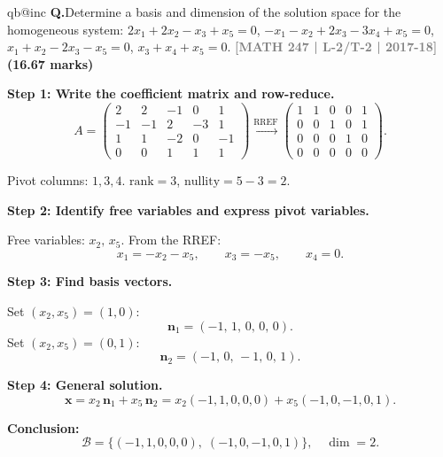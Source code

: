 \documentclass[12pt,a3paper]{article}
\makeatletter
\newcommand{\yr}[1]{\hfill\textcolor{gray}{\small\textbf{[#1]}}}
\newcommand{\mk}[1]{\textcolor{orange!70!black}{\small\textbf{(#1 marks)}}}
\newcounter{qnum}
\newcommand{\Q}[1]{%
  \csname qb@inc\endcsname
  \needspace{4\baselineskip}
  \refstepcounter{qnum}
  \vspace{6pt}
  \noindent\textbf{Q\theqnum.}\enspace #1\par
}
\makeatother
\begin{document}
\begin{tcolorbox}[enhanced,breakable,
  colback=cC!4,colframe=cC,boxrule=0.8pt,arc=5pt,
  title={\textbf{Answer --- Basis and Coordinates in $M_{22}$}},
  fonttitle=\bfseries\color{white},colbacktitle=cC]
\end{tcolorbox}

\Q{Determine a basis and dimension of the solution space for the homogeneous system:
$2x_1 + 2x_2 - x_3 + x_5 = 0$, $-x_1 - x_2 + 2x_3 - 3x_4 + x_5 = 0$, $x_1 + x_2 - 2x_3 - x_5 = 0$, $x_3 + x_4 + x_5 = 0$.
\yr{MATH 247 | L-2/T-2 | 2017-18} \mk{16.67}}

\begin{tcolorbox}[enhanced,breakable,
  colback=cC!4,colframe=cC,boxrule=0.8pt,arc=5pt,
  title={\textbf{Answer --- Solution Space of Homogeneous System}},
  fonttitle=\bfseries\color{white},colbacktitle=cC]

\textbf{Step 1: Write the coefficient matrix and row-reduce.}
\[
A = \begin{pmatrix}
 2 &  2 & -1 &  0 &  1 \\
-1 & -1 &  2 & -3 &  1 \\
 1 &  1 & -2 &  0 & -1 \\
 0 &  0 &  1 &  1 &  1
\end{pmatrix}
\xrightarrow{\text{RREF}}
\begin{pmatrix}
1 & 1 & 0 & 0 & 1 \\
0 & 0 & 1 & 0 & 1 \\
0 & 0 & 0 & 1 & 0 \\
0 & 0 & 0 & 0 & 0
\end{pmatrix}.
\]

Pivot columns: $1, 3, 4$. \quad $\mathrm{rank} = 3$, \quad $\mathrm{nullity} = 5 - 3 = 2$.

\medskip
\textbf{Step 2: Identify free variables and express pivot variables.}

Free variables: $x_2,\, x_5$. From the RREF:
\[
x_1 = -x_2 - x_5, \qquad x_3 = -x_5, \qquad x_4 = 0.
\]

\textbf{Step 3: Find basis vectors.}

Set $(x_2, x_5) = (1, 0)$:
\[
\mathbf{n}_1 = (-1,\, 1,\, 0,\, 0,\, 0).
\]
Set $(x_2, x_5) = (0, 1)$:
\[
\mathbf{n}_2 = (-1,\, 0,\, -1,\, 0,\, 1).
\]

\textbf{Step 4: General solution.}
\[
\mathbf{x} = x_2\,\mathbf{n}_1 + x_5\,\mathbf{n}_2
= x_2(-1,1,0,0,0) + x_5(-1,0,-1,0,1).
\]

\textbf{Conclusion:}
\[
\boxed{\mathcal{B} = \{(-1,1,0,0,0),\;(-1,0,-1,0,1)\}, \quad \dim = 2.}
\]

\end{tcolorbox}
\end{document}
